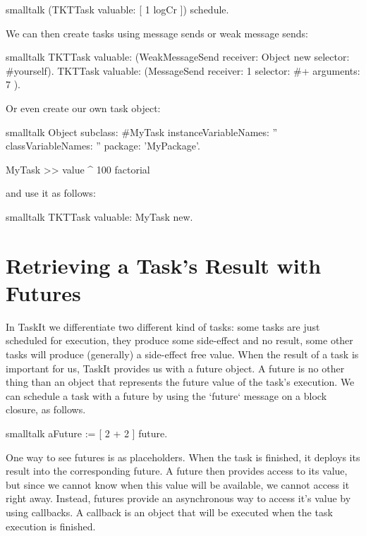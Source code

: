 \documentclass[10pt,twoside,english]{_support/latex/sbabook/sbabook}
\begin{document}
\begin{displaycode}{smalltalk}
(TKTTask valuable: [ 1 logCr ]) schedule.
\end{displaycode}

We can then create tasks using message sends or weak message sends:

\begin{displaycode}{smalltalk}
TKTTask valuable: (WeakMessageSend receiver: Object new selector: #yourself).
TKTTask valuable: (MessageSend receiver: 1 selector: #+ arguments: { 7 }).
\end{displaycode}

Or even create our own task object:

\begin{displaycode}{smalltalk}
Object subclass: #MyTask
	instanceVariableNames: ''
	classVariableNames: ''
	package: 'MyPackage'.

MyTask >> value
    ^ 100 factorial
\end{displaycode}

and use it as follows:

\begin{displaycode}{smalltalk}
TKTTask valuable: MyTask new.
\end{displaycode}
\chapter{Retrieving a Task's Result with Futures}
In TaskIt we differentiate two different kind of tasks: some tasks are just scheduled for execution, they produce some side-effect and no result, some other tasks will produce (generally) a side-effect free value. When the result of a task is important for us, TaskIt provides us with a future object. A future is no other thing than an object that represents the future value of the task's execution. We can schedule a task with a future by using the `future` message on a block closure, as follows.

\begin{displaycode}{smalltalk}
aFuture := [ 2 + 2 ] future.
\end{displaycode}

One way to see futures is as placeholders. When the task is finished, it deploys its result into the corresponding future. A future then provides access to its value, but since we cannot know when this value will be available, we cannot access it right away. Instead, futures provide an asynchronous way to access it's value by using callbacks. A callback is an object that will be executed when the task execution is finished.  
\end{document}

